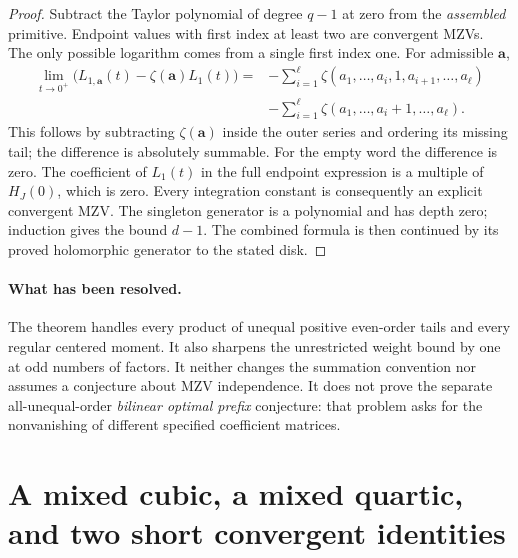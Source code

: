 \documentclass[11pt,letterpaper]{article}
\numberwithin{equation}{section}
\theoremstyle{definition}
\theoremstyle{remark}
\begin{document}
\begin{proof}
Subtract the Taylor polynomial of degree $q-1$ at zero from the
\emph{assembled} primitive. Endpoint values with first index at least
two are convergent MZVs. The only possible logarithm comes from a
single first index one. For admissible $\boldsymbol a$,
\begin{align*}
 \lim_{t\to0^+}\bigl(L_{1,\boldsymbol a}(t)
                  -\zeta(\boldsymbol a)L_1(t)\bigr)
 ={}&-\sum_{i=1}^{\ell}\zeta(a_1,\ldots,a_i,1,a_{i+1},\ldots,a_\ell)\\
    &-\sum_{i=1}^{\ell}\zeta(a_1,\ldots,a_i+1,\ldots,a_\ell).
\end{align*}
This follows by subtracting $\zeta(\boldsymbol a)$ inside the outer
series and ordering its missing tail; the difference is absolutely
summable. For the empty word the difference is zero. The coefficient
of $L_1(t)$ in the full endpoint expression is a multiple of $H_J(0)$,
which is zero. Every integration constant is consequently an explicit
convergent MZV. The singleton generator is a polynomial and has depth
zero; induction gives the bound $d-1$. The combined formula is then
continued by its proved holomorphic generator to the stated disk.
\end{proof}

\paragraph{What has been resolved.}
The theorem handles every product of unequal positive even-order tails
and every regular centered moment. It also sharpens the unrestricted
weight bound by one at odd numbers of factors. It neither changes the
summation convention nor assumes a conjecture about MZV independence.
It does not prove the separate all-unequal-order \emph{bilinear optimal
prefix} conjecture: that problem asks for the nonvanishing of different
specified coefficient matrices.



\section{A mixed cubic, a mixed quartic, and two short convergent identities}
\label{mtp:examples}
\end{document}
